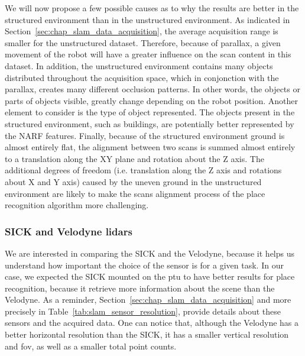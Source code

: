 We will now propose a few possible causes as to why the results are better in the structured environment than in the unstructured environment. As indicated in Section~\ref{sec:chap_slam_data_acquisition}, the average acquisition range is smaller for the unstructured dataset. Therefore, because of parallax, a given movement of the robot will have a greater influence on the scan content in this dataset. In addition, the unstructured environment contains many objects distributed throughout the acquisition space, which in conjonction with the parallax, creates many different occlusion patterns. In other words, the objects or parts of objects visible, greatly change depending on the robot position. Another element to consider is the type of object represented. The objects present in the structured environment, such as buildings, are potentially better represented by the NARF features. Finally, because of the structured environment ground is almost entirely flat, the alignment between two scans is summed almost entirely to a translation along the XY plane and rotation about the Z axis. The additional degrees of freedom (i.e. translation along the Z axis and rotations about X and Y axis) caused by the uneven ground in the unstructured environment are likely to make the scans alignment process of the place recognition algorithm more challenging. 


\subsubsection{SICK and Velodyne \gls*{lidar}s}
\label{ssec:chap_slam_sick_vs_velodyne}

We are interested in comparing the SICK and the Velodyne, because it helps us understand how important the choice of the sensor is for a given task. In our case, we expected the SICK mounted on the \gls*{ptu} to have better results for place recognition, because it retrieve more information about the scene than the Velodyne. As a reminder, Section~\ref{sec:chap_slam_data_acquisition} and more precisely in Table~\ref{tab:slam_sensor_resolution}, provide details about these sensors and the acquired data. One can notice that, although the Velodyne has a better horizontal resolution than the SICK, it has a smaller vertical resolution and \gls*{fov}, as well as a smaller total point counts. 

